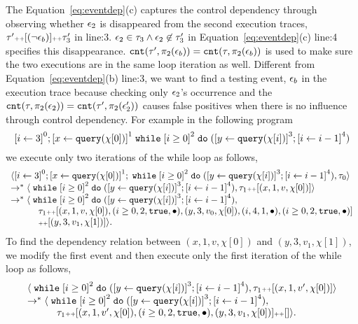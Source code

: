 The Equation~\ref{eq:eventdep}(c) captures the control dependency through observing whether $\mathtt{\epsilon}_2$ is disappeared from the second execution traces, $\mathtt{\tau}' {\scriptscriptstyle ++} [(\neg \mathtt{\epsilon}_b)] {\scriptscriptstyle ++} \mathtt{\tau}_3'$ in line:3.
$\mathtt{\epsilon}_2 \in \mathtt{\tau}_3 \land \mathtt{\epsilon}_2 \not\in \mathtt{\tau}_3'$ in Equation~\ref{eq:eventdep}(c) line:4 specifies this disappearance.
$\mathtt{cnt}(\mathtt{\tau}', \pi_2(\mathtt{\epsilon}_b)) = \mathtt{cnt}(\mathtt{\tau}, \pi_2(\mathtt{\epsilon}_b))$ is used to make sure the two executions are
in the same loop iteration as well.
Different from Equation~\ref{eq:eventdep}(b) line:3,
we want to find a testing event, $\mathtt{\epsilon}_b$ in the execution trace because checking only $\mathtt{\epsilon}_2$'s occurrence and the
$\mathtt{cnt}(\mathtt{\tau}, \pi_2(\mathtt{\epsilon}_2)) = \mathtt{cnt}(\mathtt{\tau}', \pi_2(\mathtt{\epsilon}_2'))$
causes false positives
when there is no influence through control dependency. 
For example in the following program
\[
 \clabel{\assign{i}{3}}^{0}; \clabel{\assign{x}{\query(\chi[0])}}^1 \ewhile \clabel{i \geq 0}^{2} \edo ( \clabel{\assign{y}{\query(\chi[i])}}^3; \clabel{\assign{i}{ i - 1}}^{4})
\]
we execute only two iterations of the while loop as follows,
\[
 \begin{array}{l}
 \config{
 \clabel{\assign{i}{3}}^{0}; \clabel{\assign{x}{\query(\chi[0])}}^1; \ewhile \clabel{i \geq 0}^{2} \edo ( \clabel{\assign{y}{\query(\chi[i])}}^3; \clabel{\assign{i}{ i - 1}}^{4}), \trace_0} \\
 \rightarrow^{*} \config{\ewhile \clabel{i \geq 0}^{2} \edo ( \clabel{\assign{y}{\query(\chi[i])}}^3; \clabel{\assign{i}{ i - 1}}^{4}), \trace_1 \tracecat [(x, 1, v, \chi[0])]} \\
 \rightarrow^{*}
 \config{\ewhile \clabel{i \geq 0}^{2} \edo ( \clabel{\assign{y}{\query(\chi[i])}}^3; \clabel{\assign{i}{ i - 1}}^{4}), 
 \\ \qquad \quad \trace_1 \tracecat [(x, 1, v, \chi[0]), (i \geq 0, 2, \etrue, \bullet), (y, 3, v_0, \chi[0]), (i, 4, 1, \bullet), (i \geq 0, 2, \etrue, \bullet)]
 \\ \qquad \quad \tracecat [ (y, 3, v_1, \chi[1]) ]}.
 \end{array} 
\]
To find the dependency relation between $(x, 1, v, \chi[0])$ and $(y, 3, v_1, \chi[1])$, we modify the first event and then execute only the first iteration of the while loop as follows,
\[
 \begin{array}{l}
 \config{\ewhile \clabel{i \geq 0}^{2} \edo ( \clabel{\assign{y}{\query(\chi[i])}}^3; \clabel{\assign{i}{ i - 1}}^{4}), \trace_1 \tracecat [(x, 1, v', \chi[0])]} \\
 \rightarrow^{*}
 \config{\ewhile \clabel{i \geq 0}^{2} \edo ( \clabel{\assign{y}{\query(\chi[i])}}^3; \clabel{\assign{i}{ i - 1}}^{4}),
 \\ \qquad \quad \trace_1 \tracecat [(x, 1, v', \chi[0]), (i \geq 0, 2, \etrue, \bullet), (y, 3, v_1, \chi[0])] 
  \tracecat[]}.
 \end{array} 
 \]
